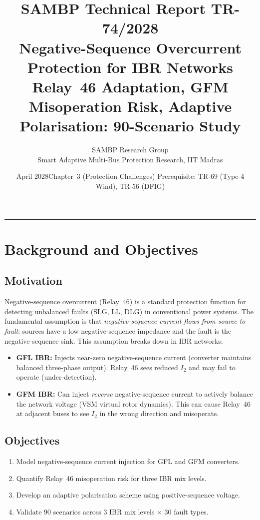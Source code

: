 \documentclass[11pt, a4paper]{article}
\title{\textbf{\textsf{\color{sambpblue}SAMBP Technical Report TR-74/2028}}\\[6pt]
  \Large Negative-Sequence Overcurrent Protection for IBR Networks\\[4pt]
  \normalsize Relay~46 Adaptation, GFM Misoperation Risk,
  Adaptive Polarisation: 90-Scenario Study}
\author{SAMBP Research Group\\[2pt]
  \small Smart Adaptive Multi-Bus Protection Research, IIT Madras}
\date{April 2028\quad\textbar\quad Chapter~3 (Protection Challenges)\quad\textbar\quad
  Prerequisite: TR-69 (Type-4 Wind), TR-56 (DFIG)}
\begin{document}
\maketitle
\tableofcontents
\vspace{6pt}\hrule\vspace{10pt}

\section{Background and Objectives}
\label{sec:background}

\subsection{Motivation}

Negative-sequence overcurrent (Relay~46) is a standard protection function
for detecting unbalanced faults (SLG, LL, DLG) in conventional power systems.
The fundamental assumption is that \emph{negative-sequence current flows from
source to fault}: sources have a low negative-sequence impedance and the fault
is the negative-sequence sink. This assumption breaks down in IBR networks:

\begin{itemize}
  \item \textbf{GFL IBR:} Injects near-zero negative-sequence current (converter
    maintains balanced three-phase output). Relay~46 sees reduced $I_2$ and
    may fail to operate (under-detection).
  \item \textbf{GFM IBR:} Can inject \emph{reverse} negative-sequence current
    to actively balance the network voltage (VSM virtual rotor dynamics).
    This can cause Relay~46 at adjacent buses to see $I_2$ in the wrong
    direction and misoperate.
\end{itemize}

\subsection{Objectives}

\begin{enumerate}
  \item Model negative-sequence current injection for GFL and GFM converters.
  \item Quantify Relay~46 misoperation risk for three IBR mix levels.
  \item Develop an adaptive polarisation scheme using positive-sequence voltage.
  \item Validate 90 scenarios across $3$ IBR mix levels $\times$ $30$ fault types.
\end{enumerate}
\end{document}
